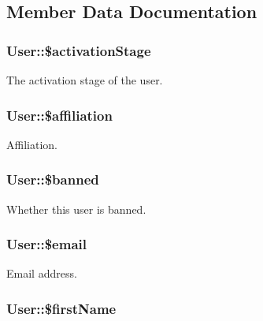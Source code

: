 \subsection{Member Data Documentation}
\hypertarget{classUser_a995afa541722c3e53380a54850f56048}{
\subsubsection[{\$activationStage}]{\setlength{\rightskip}{0pt plus 5cm}User::\$activationStage}}
\label{classUser_a995afa541722c3e53380a54850f56048}
The activation stage of the user. \hypertarget{classUser_aea3a79f42359f935052c79cf9ad702f3}{
\subsubsection[{\$affiliation}]{\setlength{\rightskip}{0pt plus 5cm}User::\$affiliation}}
\label{classUser_aea3a79f42359f935052c79cf9ad702f3}
Affiliation. \hypertarget{classUser_a80dcdcc86bf2441ac7f7c130da7e182e}{
\subsubsection[{\$banned}]{\setlength{\rightskip}{0pt plus 5cm}User::\$banned}}
\label{classUser_a80dcdcc86bf2441ac7f7c130da7e182e}
Whether this user is banned. \hypertarget{classUser_a3bef7b70689d1e56cafbf750ff6a4aed}{
\subsubsection[{\$email}]{\setlength{\rightskip}{0pt plus 5cm}User::\$email}}
\label{classUser_a3bef7b70689d1e56cafbf750ff6a4aed}
Email address. \hypertarget{classUser_ab4216ecb16d420f69cb32659a6744846}{
\subsubsection[{\$firstName}]{\setlength{\rightskip}{0pt plus 5cm}User::\$firstName}}
